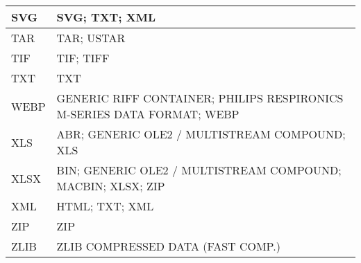 \begin{tabular}{|l|p{10cm}|}
\hline
SVG & SVG; TXT; XML \\
\hline
TAR & TAR; USTAR \\
\hline
TIF & TIF; TIFF \\
\hline
TXT & TXT \\
\hline
WEBP & GENERIC RIFF CONTAINER; PHILIPS RESPIRONICS M-SERIES DATA FORMAT; WEBP \\
\hline
XLS & ABR; GENERIC OLE2 / MULTISTREAM COMPOUND; XLS \\
\hline
XLSX & BIN; GENERIC OLE2 / MULTISTREAM COMPOUND; MACBIN; XLSX; ZIP \\
\hline
XML & HTML; TXT; XML \\
\hline
ZIP & ZIP \\
\hline
ZLIB & ZLIB COMPRESSED DATA (FAST COMP.) \\
\hline
\bottomrule
\end{tabular}
